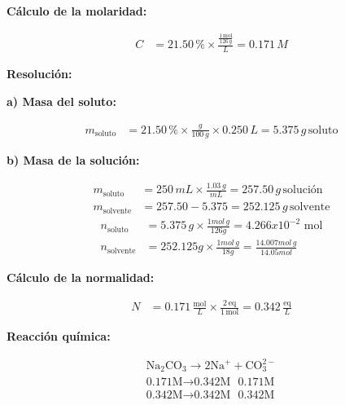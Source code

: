 \documentclass{article}
\begin{document}
\begin{multicols}{2}
\textbf{Cálculo de la molaridad:}

\begin{align*}
    C &= 21.50 \, \% \times \frac{\frac{1 \, \text{mol}}{126 \, g}}{L} = 0.171 \, M
\end{align*}

\columnbreak %

\noindent\textbf{Resolución:} %

\textbf{a) Masa del soluto:}

\begin{align*}
    m_{\text{soluto}} &= 21.50 \, \% \times \frac{g}{100 \, g} \times 0.250 \, L = 5.375 \, g \, \text{soluto}
\end{align*}

\textbf{b) Masa de la solución:}

\begin{align*}
    m_{\text{soluto}} &= 250 \, mL \times \frac{1.03 \, g}{mL} = 257.50 \, g \, \text{solución} \\[10pt]
    m_{\text{solvente}} &= 257.50 - 5.375 = 252.125 \, g \, \text{solvente}
\end{align*}
\begin{align*}
    n_{\text{soluto}} &= 5.375 \, g \times \frac{1mol \, g}{126g} = 4.266x10^{-2} \,  \, \text{mol} \\[10pt]
    n_{\text{solvente}} &= 252.125g \times \frac{1mol \, g}{18g} = \frac{14.007mol \, g}{14.05mol}
\end{align*}


\textbf{Cálculo de la normalidad:}

\begin{align*}
    N &= 0.171 \, \frac{\text{mol}}{L} \times \frac{2 \, \text{eq}}{1 \, \text{mol}} = 0.342 \, \frac{\text{eq}}{L}
\end{align*}

\textbf{Reacción química:}

\begin{align*}
    \text{Na}_2\text{CO}_3 \rightarrow 2\text{Na}^+ + \text{CO}_3^{2-} \\
    \text{0.171M} \rightarrow \text{0.342M } \text{ 0.171M} \\
    \text{0.342M} \rightarrow \text{0.342M }\text{ 0.342M}
\end{align*}

\end{multicols} %
\end{document}
